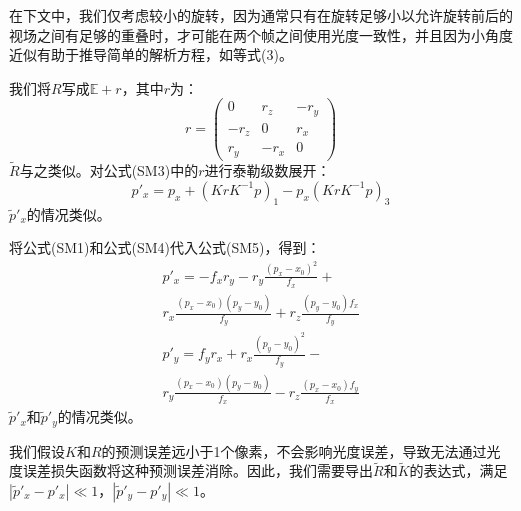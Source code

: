 \documentclass[10pt,journal,compsoc,UTF8]{IEEEtran}
\begin{document}
在下文中，我们仅考虑较小的旋转，因为通常只有在旋转足够小以允许旋转前后的视场之间有足够的重叠时，才可能在两个帧之间使用光度一致性，并且因为小角度近似有助于推导简单的解析方程，如等式(3)。

我们将$R$写成$\mathbb{E}+r$，其中$r$为：
\begin{equation}
  r = \begin{pmatrix}
      0 & r_z&-r_y\\
    -r_z&  0 & r_x\\
     r_y&-r_x&  0    
  \end{pmatrix}
  \tag{SM4}
\end{equation}
$\tilde{R}$与之类似。对公式(SM3)中的$r$进行泰勒级数展开：
\begin{equation}
  p'_x=p_x+(KrK^{-1}p)_1-p_x(KrK^{-1}p)_3
  \tag{SM5}
\end{equation}
$\tilde{p}'_x$的情况类似。

将公式(SM1)和公式(SM4)代入公式(SM5)，得到：
\begin{multline}
  p'_x=-f_xr_y-r_y\frac{(p_x-x_0)^2}{f_x}+\\
  r_x\frac{(p_x-x_0)(p_y-y_0)}{f_y}+r_z\frac{(p_y-y_0)f_x}{f_y}
  \tag{SM6}
\end{multline}
\begin{multline}
  p'_y=f_yr_x+r_x\frac{(p_y-y_0)^2}{f_y}-\\
  r_y\frac{(p_x-x_0)(p_y-y_0)}{f_x}-r_z\frac{(p_x-x_0)f_y}{f_x}
  \tag{SM7}
\end{multline}
$\tilde{p}'_x$和$\tilde{p}'_y$的情况类似。

我们假设$K$和$R$的预测误差远小于1个像素，不会影响光度误差，导致无法通过光度误差损失函数将这种预测误差消除。因此，我们需要导出$\tilde{R}$和$\tilde{K}$的表达式，满足$|\tilde{p}'_x-p'_x|\ll1$，$|\tilde{p}'_y-p'_y|\ll1$。
\end{document}
